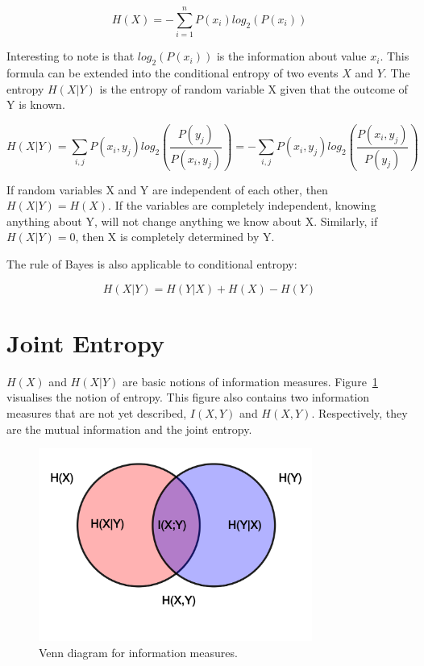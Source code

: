 \begin{equation}
H(X) = -\sum_{i=1}^{n}P(x_i)log_2(P(x_i))
\end{equation}

Interesting to note is that $log_2(P(x_i))$ is the information about value $x_i$. This formula can be extended into the conditional entropy of two events $X$ and $Y$. The entropy $H(X|Y)$ is the entropy of random variable X given that the outcome of Y is known.

\begin{equation}
H(X|Y) = \sum_{i,j}P(x_i, y_j)log_2(\frac{P(y_j)}{P(x_i, y_j)}) = -\sum_{i,j}P(x_i, y_j)log_2(\frac{P(x_i, y_j)}{P(y_j)})
\end{equation}

If random variables X and Y are independent of each other, then $H(X|Y) = H(X)$. If the variables are completely independent, knowing anything about Y, will not change anything we know about X. Similarly, if $H(X|Y) = 0$, then X is completely determined by Y. 

The rule of Bayes is also applicable to conditional entropy:

\begin{equation}
H(X|Y) = H(Y|X) + H(X) - H(Y)
\end{equation}

\section{Joint Entropy}

$H(X)$ and $H(X|Y)$ are basic notions of information measures. Figure~\ref{entropy} visualises the notion of entropy. This figure also contains two information measures that are not yet described, $I(X,Y)$ and $H(X,Y)$. Respectively, they are the mutual information and the joint entropy.

\begin{figure}[!htb]
\caption{Venn diagram for information measures.}
\label{entropy}
    \centering
    \includegraphics[width=0.8\textwidth]{fig/entropy}
\end{figure}

